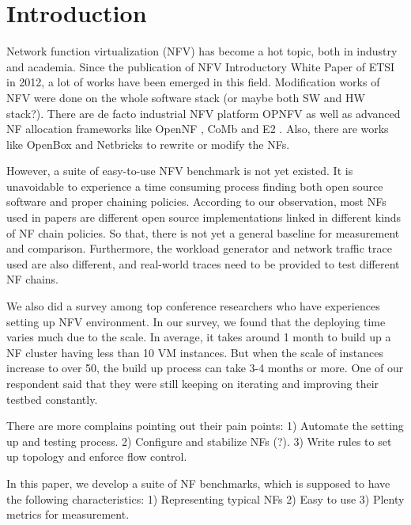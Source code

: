 \documentclass{sig-alternate-10pt}
\begin{document}


\section{Introduction}

Network function virtualization (NFV) has become a hot topic, both in industry and academia. Since the publication of NFV Introductory White Paper \cite{} of ETSI in 2012, a lot of works have been emerged in this field. Modification works of NFV were done on the whole software stack (or maybe both SW and HW stack?). There are de facto industrial NFV platform OPNFV \cite{} as well as advanced NF allocation frameworks like OpenNF \cite{}, CoMb \cite{} and E2 \cite{}. Also, there are works like OpenBox \cite{} and Netbricks \cite{} to rewrite or modify the NFs.

However, a suite of easy-to-use NFV benchmark is not yet existed. It is unavoidable to experience a time consuming process finding both open source software and proper chaining policies. According to our observation, most NFs used in papers are different open source implementations linked in different kinds of NF chain policies. So that, there is not yet a general baseline for measurement and comparison. Furthermore, the workload generator and network traffic trace used are also different, and real-world traces need to be provided to test different NF chains.

We also did a survey among top conference researchers who have experiences setting up NFV environment. In our survey, we found that the deploying time varies much due to the scale. In average, it takes around 1 month to build up a NF cluster having less than 10 VM instances. But when the scale of instances increase to over 50, the build up process can take 3-4 months or more. One of our respondent said that they were still keeping on iterating and improving their testbed constantly.

There are more complains pointing out their pain points: 1) Automate the setting up and testing process. 2) Configure and stabilize NFs (?). 3) Write rules to set up topology and enforce flow control.

In this paper, we develop a suite of NF benchmarks, which is supposed to have the following characteristics: 1) Representing typical NFs 2) Easy to use 3) Plenty metrics for measurement.
\end{document}
